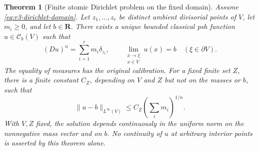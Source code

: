 \documentclass[11pt,a4paper]{article}
\numberwithin{equation}{section}
\newtheorem{theorem}{Theorem}[section]
\theoremstyle{definition}
\theoremstyle{remark}
\newcommand{\Cb}{\mathcal C_b}
\begin{document}
\begin{theorem}[Finite atomic Dirichlet problem on the fixed domain]
\label{thm:r3-finite-atomic-dirichlet}
Assume \eqref{eq:r3-dirichlet-domain}. Let $z_1,\ldots,z_r$
be distinct ambient divisorial points of $V$, let $m_i\geq0$,
and let $b\in\mathbf R$. There exists a unique bounded
classical psh function $u\in\Cb(V)$ such that
\[
 (Du)^n=\sum_{i=1}^r m_i\delta_{z_i},\qquad
 \lim_{\substack{x\to\xi\\x\in V}}u(x)=b
                         \quad(\xi\in\partial V).
 \tag{4}\label{eq:r3-atomic-dirichlet}
\]
The equality of measures has the original calibration.
For a fixed finite set $Z$, there is a finite constant
$C_Z$, depending on $V$ and $Z$ but not on the masses or
$b$, such that
\[
 \|u-b\|_{L^\infty(V)}
       \leq C_Z\left(\sum_i m_i\right)^{1/n}.
 \tag{5}\label{eq:r3-finite-atomic-bound}
\]
With $V,Z$ fixed, the solution depends continuously in the
uniform norm on the nonnegative mass vector and on $b$.
No continuity of $u$ at arbitrary interior points is asserted
by this theorem alone.
\end{theorem}
\end{document}
